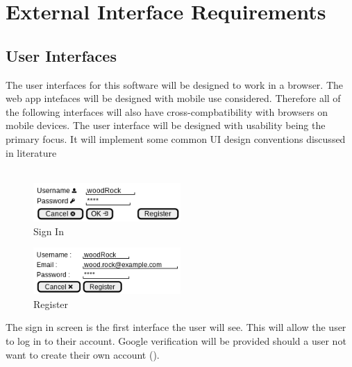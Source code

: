 \documentclass{article}
\newcommand{\comment}[1]{}
\begin{document}
\section{External Interface Requirements}
\subsection{User Interfaces}
\comment{
	Describe the logical characteristics of each interface between the software product and users. This may include smaple screen images, any GUI standards or product family style guides that are to be followed, screen layout contraints, standard buttons and functions (e.g., help) that will appear on every screen, keyboard shortcuts, error message display standards, and so on. Define the software components for which a user interface is needed. Details of the user interface should be documented in a seperate user interface specification.
	}
The user interfaces for this software will be designed to work in a browser. The web app intefaces will be designed with mobile use considered. Therefore all of the following interfaces will also have cross-compbatibility with browsers on mobile devices. The user interface will be designed with usability being the primary focus. It will implement some common UI design conventions discussed in literature \parencite{aboutface14}
\\ \\
\begin{figure}[H]\label{sign-in}
\caption{Sign In}
\centering
\includegraphics[width=0.5\textwidth]{sign-in.png}
\end{figure}
\begin{figure}[H]\label{register}
\caption{Register}
\centering
\includegraphics[width=0.5\textwidth]{register.png}
\end{figure}
The sign in screen is the first interface the user will see. This will allow the user to log in to their account. Google verification will be provided should a user not want to create their own account ().
\\ \\
\end{document}
